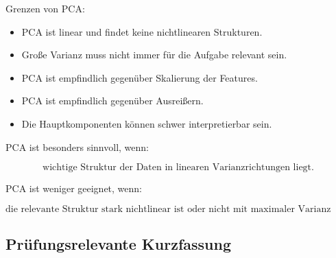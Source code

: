\documentclass[11pt,a4paper]{scrartcl}
\begin{document}
\begin{solutionbox}
    Grenzen von PCA:

    \begin{itemize}
        \item PCA ist linear und findet keine nichtlinearen Strukturen.
        \item Große Varianz muss nicht immer für die Aufgabe relevant sein.
        \item PCA ist empfindlich gegenüber Skalierung der Features.
        \item PCA ist empfindlich gegenüber Ausreißern.
        \item Die Hauptkomponenten können schwer interpretierbar sein.
    \end{itemize}
\end{solutionbox}

\begin{answerbox}
    PCA ist besonders sinnvoll, wenn:

    \[
        \boxed{
            \text{wichtige Struktur der Daten in linearen Varianzrichtungen liegt.}
        }
    \]

    PCA ist weniger geeignet, wenn:

    \[
        \boxed{
            \text{die relevante Struktur stark nichtlinear ist oder nicht mit maximaler Varianz zusammenhängt.}
        }
    \]
\end{answerbox}

\subsection{Prüfungsrelevante Kurzfassung}
\end{document}
